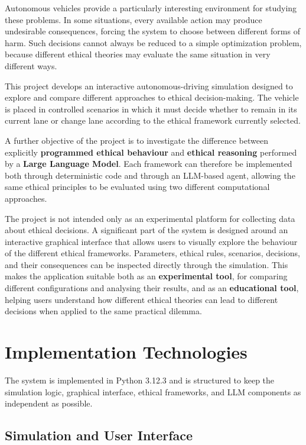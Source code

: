 \documentclass[10pt,a4paper]{article}
\begin{document}
Autonomous vehicles provide a particularly interesting environment for studying these problems. In some situations, every available action may produce undesirable consequences, forcing the system to choose between different forms of harm. Such decisions cannot always be reduced to a simple optimization problem, because different ethical theories may evaluate the same situation in very different ways.

This project develops an interactive autonomous-driving simulation designed to explore and compare different approaches to ethical decision-making. The vehicle is placed in controlled scenarios in which it must decide whether to remain in its current lane or change lane according to the ethical framework currently selected.

A further objective of the project is to investigate the difference between explicitly \textbf{programmed ethical behaviour} and \textbf{ethical reasoning} performed by a \textbf{Large Language Model}. Each framework can therefore be implemented both through deterministic code and through an LLM-based agent, allowing the same ethical principles to be evaluated using two different computational approaches.

The project is not intended only as an experimental platform for collecting data about ethical decisions. A significant part of the system is designed around an interactive graphical interface that allows users to visually explore the behaviour of the different ethical frameworks. Parameters, ethical rules, scenarios, decisions, and their consequences can be inspected directly through the simulation. This makes the application suitable both as an \textbf{experimental tool}, for comparing different configurations and analysing their results, and as an \textbf{educational tool}, helping users understand how different ethical theories can lead to different decisions when applied to the same practical dilemma.


\section{Implementation Technologies}

The system is implemented in Python 3.12.3 \cite{python3123} and is
structured to keep the simulation logic, graphical interface, ethical
frameworks, and LLM components as independent as possible.

\subsection{Simulation and User Interface}
\end{document}
